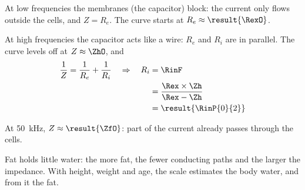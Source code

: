 \begin{abcliste}
\abc At low frequencies the membranes (the capacitor) block: the current only flows outside the cells, and $Z = R_e$. The curve starts at $R_e \approx \result{\RexO}$.

\abc At high frequencies the capacitor acts like a wire: $R_e$ and $R_i$ are in parallel. The curve levels off at $Z \approx \ZhO$, and
\begin{align}
 \frac{1}{Z} = \frac{1}{R_e} + \frac{1}{R_i} \quad\Rightarrow\quad R_i &= \RinF \\
   &= \frac{\Rex\times\Zh}{\Rex - \Zh} \\
   &= \result{\RinP{0}{2}}
\end{align}

\abc At \SI{50}{\kilo\hertz}, $Z \approx \result{\ZfO}$: part of the current already passes through the cells.

Fat holds little water: the more fat, the fewer conducting paths and the larger the impedance. With height, weight and age, the scale estimates the body water, and from it the fat.
\end{abcliste}
